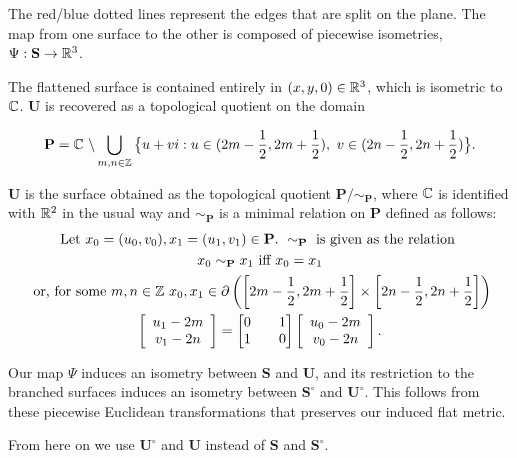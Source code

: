 \documentclass[]{article}
\def\bU{\mathbf{U}} \def\btU{\tilde{\bU}} \def\bUs{\bU^\circ}
\begin{document}
\noindent The red/blue dotted lines represent the edges that are split on the plane. The map from one surface to the other is composed of piecewise isometries, $\Psi:\mathbf{S}\rightarrow\mathbb{R}^3$.



The flattened surface is contained entirely in $(x,y,0)\in\mathbb{R}^3$, which is isometric to $\mathbb{C}$. $\bU$ is recovered as a topological quotient on the domain

\begin{equation}
\label{eq:P}
\mathbf{P} = \mathbb{C}\text{ }\backslash\bigcup_{m,n \in {\mathbb Z}} \big{\{} u+vi:u\in(2m-\frac{1}{2},2m+\frac{1}{2}),\text{ } v\in(2n-\frac{1}{2},2n+\frac{1}{2})\big{\}}.
\end{equation}

\begin{Def} $\mathbf U$ is the surface obtained as the topological quotient $\mathbf{P}/\sim_{\mathbf{P}}$, where $\mathbb{C}$ is identified with $\mathbb{R}^2$ in the usual way and $\sim_{\mathbf{P}}$ is a minimal relation on $\mathbf{P}$ defined as follows:
\begin{gather*}
\text{Let } x_{0}=(u_{0},v_{0}),x_{1}=(u_{1},v_{1}) \in \mathbf{P}.  \text{ }\sim_{\mathbf{P}} \text { is given as the relation }\\ x_{0}\sim_{\mathbf{P}}x_{1}  \text{ iff } x_{0}=x_{1}
 \\\text{ or, for some }m,n\in\mathbb{Z}~x_{0},x_{1} \in {\partial} \left( \left[2m-\frac{1}{2},2m+\frac{1}{2}\right] \times \left[2n-\frac{1}{2},2n+\frac{1}{2}\right] \right)\\
  \left[\begin{array}{c}
u_{1} -2m
\\v_{1}-2n
\end{array}\right] = \left[\begin{matrix}
0 && 1\\
1 && 0
\end{matrix}\right]
\left[ \begin{array}{c}u_{0}-2m\\
v_{0}-2n
\end{array}\right]
.\end{gather*}\end{Def}

\begin{rem}
Our map $\Psi$ induces an isometry between $\mathbf{S}$ and $\bU$, and its restriction to the branched surfaces induces an isometry between $\mathbf{S}^\circ$ and $\bUs$. This follows from these piecewise Euclidean transformations that preserves our induced flat metric.
\end{rem}
From here on we use $\bUs$ and $\bU$ instead of $\mathbf{S}$ and $\mathbf{S}^\circ$.
\end{document}
